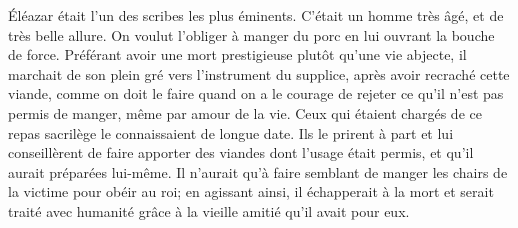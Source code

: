 Éléazar était l’un des scribes les plus éminents.
C’était un homme très âgé, et de très belle allure.
	On voulut l’obliger à manger du porc en lui ouvrant la bouche de force.
Préférant avoir une mort prestigieuse plutôt qu’une vie abjecte,
	il marchait de son plein gré vers l’instrument du supplice,
	après avoir recraché cette viande,
	comme on doit le faire
		quand on a le courage de rejeter ce qu’il n’est pas permis de manger,
	même par amour de la vie.
Ceux qui étaient chargés de ce repas sacrilège le connaissaient de longue date.
Ils le prirent à part
	et lui conseillèrent de faire apporter des viandes dont l’usage était permis,
	et qu’il aurait préparées lui-même.
Il n’aurait qu’à faire semblant de manger les chairs de la victime pour obéir au roi;
	en agissant ainsi, il échapperait à la mort et serait traité avec humanité
	grâce à la vieille amitié qu’il avait pour eux.
